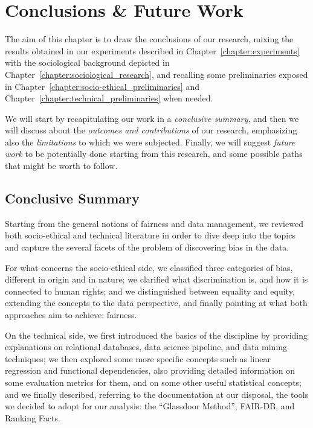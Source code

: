 \chapter{Conclusions \& Future Work}
\label{chapter:conclusions_future_work}
\thispagestyle{empty}

The aim of this chapter is to draw the conclusions of our research, mixing the results obtained in our experiments described in Chapter~\ref{chapter:experiments} with the sociological background depicted in Chapter~\ref{chapter:sociological_research}, and recalling some preliminaries exposed in Chapter~\ref{chapter:socio-ethical_preliminaries} and Chapter~\ref{chapter:technical_preliminaries} when needed.

We will start by recapitulating our work in a \textit{conclusive summary}, and then we will discuss about the \textit{outcomes and contributions} of our research, emphasizing also the \textit{limitations} to which we were subjected. Finally, we will suggest \textit{future work} to be potentially done starting from this research, and some possible paths that might be worth to follow.


\section{Conclusive Summary}
Starting from the general notions of fairness and data management, we reviewed both socio-ethical and technical literature in order to dive deep into the topics and capture the several facets of the problem of discovering bias in the data.

For what concerns the socio-ethical side, we classified three categories of bias, different in origin and in nature; we clarified what discrimination is, and how it is connected to human rights; and we distinguished between equality and equity, extending the concepts to the data perspective, and finally pointing at what both approaches aim to achieve: fairness.

On the technical side, we first introduced the basics of the discipline by providing explanations on relational databases, data science pipeline, and data mining techniques; we then explored some more specific concepts such as linear regression and functional dependencies, also providing detailed information on some evaluation metrics for them, and on some other useful statistical concepts; and we finally described, referring to the documentation at our disposal, the tools we decided to adopt for our analysis: the ``Glassdoor Method'', FAIR-DB, and Ranking Facts.

